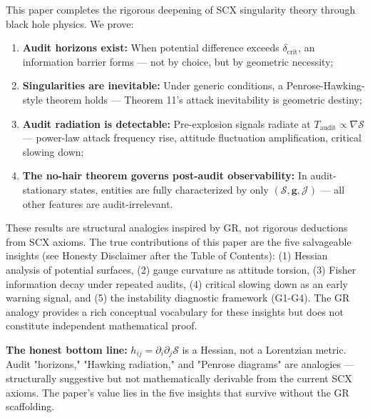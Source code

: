 \documentclass[12pt,a4paper]{article}
\theoremstyle{remark}
\newcommand{\g}{\mathbf{g}}
\begin{document}
This paper completes the rigorous deepening of SCX singularity theory through black hole physics. We prove:

\begin{enumerate}[label=(\arabic*)]
    \item \textbf{Audit horizons exist:} When potential difference exceeds $\delta_{\mathrm{crit}}$, an information barrier forms — not by choice, but by geometric necessity;
    
    \item \textbf{Singularities are inevitable:} Under generic conditions, a Penrose-Hawking-style theorem holds — Theorem 11's attack inevitability is geometric destiny;
    
    \item \textbf{Audit radiation is detectable:} Pre-explosion signals radiate at $T_{\mathrm{audit}} \propto \nabla\mathcal{S}$ — power-law attack frequency rise, attitude fluctuation amplification, critical slowing down;
    
    \item \textbf{The no-hair theorem governs post-audit observability:} In audit-stationary states, entities are fully characterized by only $(\mathcal{S}, \g, \mathcal{J})$ — all other features are audit-irrelevant.
\end{enumerate}

These results are structural analogies inspired by GR, not rigorous deductions from
SCX axioms. The true contributions of this paper are the five salvageable insights
(see Honesty Disclaimer after the Table of Contents): (1) Hessian analysis of potential
surfaces, (2) gauge curvature as attitude torsion, (3) Fisher information decay under
repeated audits, (4) critical slowing down as an early warning signal, and (5) the
instability diagnostic framework (G1-G4). The GR analogy provides a rich conceptual
vocabulary for these insights but does not constitute independent mathematical proof.

\vspace{4pt}
\noindent
\textbf{The honest bottom line:} $h_{ij} = \partial_i\partial_j\mathcal{S}$ is a Hessian,
not a Lorentzian metric. Audit "horizons," "Hawking radiation," and "Penrose diagrams"
are analogies — structurally suggestive but not mathematically derivable from the
current SCX axioms. The paper's value lies in the five insights that survive without
the GR scaffolding.
\end{document}
